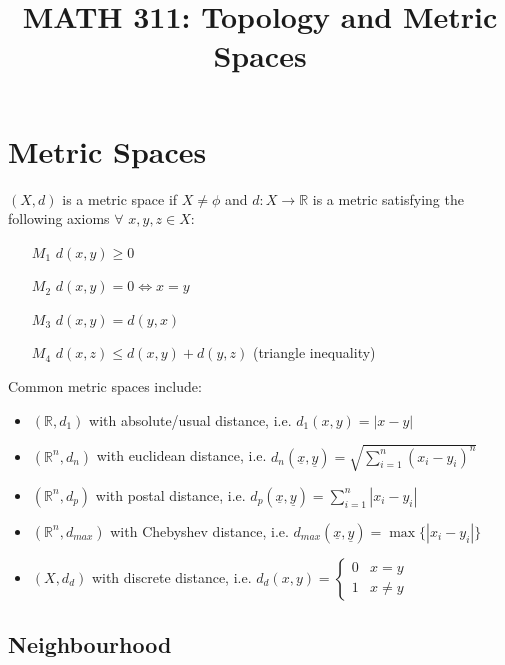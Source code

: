 \documentclass{article}
\title{MATH 311: Topology and Metric Spaces}
\date{}
\begin{document}
\maketitle

\tableofcontents

\break

\section{Metric Spaces}

$(X,d)$ is a metric space if $X \not= \phi$ and $d: X \rightarrow \mathbb{R}$ is a metric satisfying the following axioms $\forall$ $x,y,z \in X$:

\begin{itemize}
	\item[$M_1$] $d(x,y) \geq 0$
	\item[$M_2$] $d(x,y) = 0 \iff x=y$
	\item[$M_3$] $d(x,y) = d(y,x)$
	\item[$M_4$] $d(x,z) \leq d(x,y) + d(y,z)$ (triangle inequality)
\end{itemize}

Common metric spaces include:
\begin{itemize}
	\item $(\mathbb{R}, d_1)$ with absolute/usual distance, i.e. $d_1(x,y) = |x - y|$
	\item $(\mathbb{R}^n, d_n)$ with euclidean distance, i.e. $d_n(\underline{x},\underline{y}) = \sqrt{\sum_{i=1}^{n} (x_i-y_i)^n}$
	\item $(\mathbb{R}^n, d_p)$ with postal distance, i.e. $d_p(\underline{x},\underline{y}) = \sum_{i=1}^{n} |x_i-y_i|$
	\item $(\mathbb{R}^n, d_{max})$ with Chebyshev distance, i.e. $d_{max}(\underline{x},\underline{y}) = \max\{|x_i-y_i|\}$
	\item $(X, d_d)$ with discrete distance, i.e. $d_d(x,y) = \begin{cases} 0 & x=y \\ 1 & x\not= y \end{cases}$
\end{itemize}

\subsection{Neighbourhood}
\end{document}

